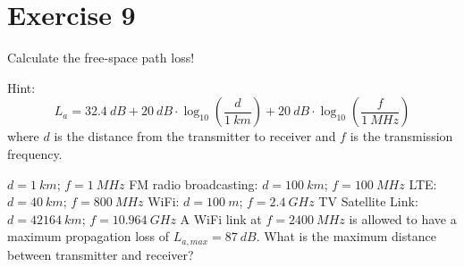 %
%
%

{}
\section*{Exercise 9}








\begin{question}[subtitle={Free Space Path Loss}]
	Calculate the free-space path loss!
	
	Hint:
	\begin{equation*}
		L_a = \SI{32.4}{dB} + \SI{20}{dB} \cdot \log_{10}\left(\frac{d}{\SI{1}{km}}\right) + \SI{20}{dB} \cdot \log_{10}\left(\frac{f}{\SI{1}{MHz}}\right)
	\end{equation*}
	where $d$ is the distance from the transmitter to receiver and $f$ is the transmission frequency.
	
	\begin{tasks}
		\task
		$d = \SI{1}{km}$; $f = \SI{1}{MHz}$
		\task
		FM radio broadcasting: $d = \SI{100}{km}$; $f = \SI{100}{MHz}$
		\task
		LTE: $d = \SI{40}{km}$; $f = \SI{800}{MHz}$
		\task
		WiFi: $d = \SI{100}{m}$; $f = \SI{2.4}{GHz}$
		\task
		TV Satellite Link: $d = \SI{42164}{km}$; $f = \SI{10.964}{GHz}$
		\task
		A WiFi link at $f = \SI{2400}{MHz}$ is allowed to have a maximum propagation loss of $L_{a,max} = \SI{87}{dB}$. What is the maximum distance between transmitter and receiver?
	\end{tasks}
\end{question}

